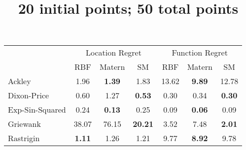 \documentclass{article}
\title{20 initial points; 50 total points}
\begin{document}
\maketitle

\begin{center}
\begin{tabular}{ | l | c | c | c | c | c | c |}
\hline
& \multicolumn{3}{|c|}{Location Regret} & \multicolumn{3}{|c|}{Function Regret} \\
\cline{2-7}
& RBF & Matern & SM & RBF & Matern & SM \\
\hline
Ackley & 1.96 & \textbf{1.39} & 1.83 & 13.62 & \textbf{9.89} & 12.78 \\
\hline
Dixon-Price & 0.60 & 1.27 & \textbf{0.53} & 0.30 & 0.34 & \textbf{0.30} \\
\hline
Exp-Sin-Squared & 0.24 & \textbf{0.13} & 0.25 & 0.09 & \textbf{0.06} & 0.09 \\
\hline
Griewank & 38.07 & 76.15 & \textbf{20.21} & 3.52 & 7.48 & \textbf{2.01} \\
\hline
Rastrigin & \textbf{1.11} & 1.26 & 1.21 & 9.77 & \textbf{8.92} & 9.78 \\
\hline
\end{tabular}
\end{center}
\end{document}
